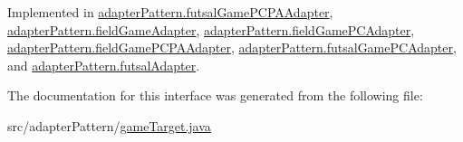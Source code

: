 Implemented in \mbox{\hyperlink{classadapter_pattern_1_1futsal_game_p_c_p_a_adapter_a6349af17da6ad49b3bd5cd23db7e6e54}{adapter\+Pattern.\+futsal\+Game\+P\+C\+P\+A\+Adapter}}, \mbox{\hyperlink{classadapter_pattern_1_1field_game_adapter_a1b2122a14b0bab5a09d065da2bd7e4bc}{adapter\+Pattern.\+field\+Game\+Adapter}}, \mbox{\hyperlink{classadapter_pattern_1_1field_game_p_c_adapter_a628eaa84c2864e5a3965a713665bd802}{adapter\+Pattern.\+field\+Game\+P\+C\+Adapter}}, \mbox{\hyperlink{classadapter_pattern_1_1field_game_p_c_p_a_adapter_a3fd416ee138bfbce32b5541ffd651bfc}{adapter\+Pattern.\+field\+Game\+P\+C\+P\+A\+Adapter}}, \mbox{\hyperlink{classadapter_pattern_1_1futsal_game_p_c_adapter_a4a2771736086916d3dc766e417a7913a}{adapter\+Pattern.\+futsal\+Game\+P\+C\+Adapter}}, and \mbox{\hyperlink{classadapter_pattern_1_1futsal_adapter_a5832c5c7032e7254a7d3476e72f9834f}{adapter\+Pattern.\+futsal\+Adapter}}.



The documentation for this interface was generated from the following file\+:\begin{DoxyCompactItemize}
\item 
src/adapter\+Pattern/\mbox{\hyperlink{game_target_8java}{game\+Target.\+java}}\end{DoxyCompactItemize}

